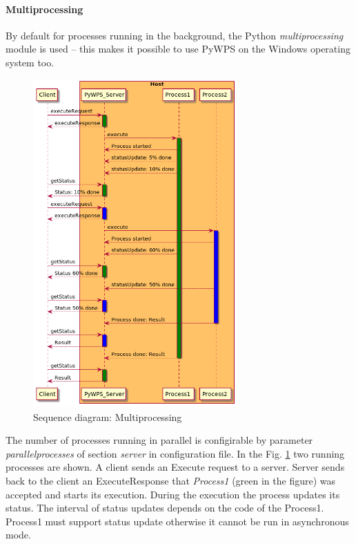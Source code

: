
\paragraph{Multiprocessing}
By default for  processes running in the background, the Python \textit{multiprocessing} module is used – 
this makes it possible to use PyWPS on the Windows operating system too.

\begin{figure}[h!]
\centering
\includegraphics[width=0.7\textwidth]{img/Diag_multiprocessing.png}
\caption{Sequence diagram: Multiprocessing}
\label{fig:Diag_multiprocessing}
\end{figure}

The number of processes running in parallel is configirable by parameter \textit{parallelprocesses} of section \textit{server} in 
configuration file. In the Fig. \ref{fig:Diag_multiprocessing} two running processes are shown. A client sends an Execute request to
a server. Server sends back to the client an ExecuteResponse that \textit{Process1} (green in the figure) was accepted and starts its 
execution. During the execution the process updates its status. The interval of status updates depends on the code of the Process1.
Process1 must support status update otherwise it cannot be run in asynchronous mode.

